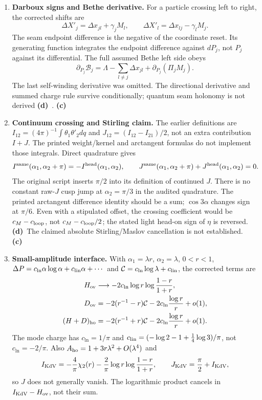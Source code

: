\documentclass[11pt,a4paper]{article}
\newcommand{\C}{\textbf{(c)}\ }
\newcommand{\D}{\textbf{(d)}\ }
\begin{document}
\begin{enumerate}[leftmargin=*]
$t\log t$ terms, so ``smooth'' is too strong.
\item \textbf{Darboux signs and Bethe derivative.} For a particle crossing
left to right, the corrected shifts are
\[
 \Delta X'_j=\Delta x_{jl}+\gamma_jM_l,\qquad
 \Delta X'_l=\Delta x_{lj}-\gamma_lM_j.
\]
The seam endpoint difference is the negative of the coordinate reset.
Its generating function integrates the endpoint difference against $dP_j$,
not $P_j$ against its differential. The full assumed Bethe left side obeys
\[
 \partial_{P_j}\mathcal B_j
 =\Lambda-\sum_{l\ne j}\Delta x_{jl}+\partial_{P_j}(\Pi_jM_j).
\]
The last self-winding derivative was omitted. The directional derivative
and summed charge rule survive conditionally; quantum seam holonomy is not
derived \D. \C
\item \textbf{Continuum crossing and Stirling claim.} The earlier definitions
are $I_{12}=(4\pi)^{-1}\int\theta_1\theta'_2dq$ and
$J_{12}=(I_{12}-I_{21})/2$, not an extra contribution $I+J$.
The printed weight/kernel and arctangent formulas do not implement those
integrals. Direct quadrature gives
\[
 I^{\rm same}(\alpha_1,\alpha_2+\pi)=-I^{\rm head}(\alpha_1,\alpha_2),
 \qquad J^{\rm same}(\alpha_1,\alpha_2+\pi)+J^{\rm head}(\alpha_1,\alpha_2)=0.
\]
The original script inserts $\pi/2$ into its definition of continued $J$.
There is no constant raw-$J$ cusp jump at $\alpha_2=\pi/3$ in the audited
quadrature. The printed arctangent difference identity should be a sum;
$\cos3\alpha$ changes sign at $\pi/6$. Even with a stipulated offset,
the crossing coefficient would be $c_M-c_{\rm loop}$, not
$c_M-c_{\rm loop}/2$; the stated light head-on sign of $\eta$ is reversed.
\D The claimed absolute Stirling/Maslov cancellation is not established. \C
\item \textbf{Small-amplitude interface.} With
$\alpha_1=\lambda r$, $\alpha_2=\lambda$, $0<r<1$,
$\Delta P=c_{\ln}\alpha\log\alpha+c_{\rm lin}\alpha+\cdots$ and
$\mathcal C=c_{\ln}\log\lambda+c_{\rm lin}$, the corrected terms are
\begin{align*}
 H_{\rm ov}&\longrightarrow-2c_{\ln}\log r\log\frac{1-r}{1+r},\\
 D_{\rm ov}&=-2(r^{-1}-r)\mathcal C-2c_{\ln}\frac{\log r}{r}+o(1),\\
 (H+D)_{\rm ho}&=-2(r^{-1}+r)\mathcal C-2c_{\ln}\frac{\log r}{r}+o(1).
\end{align*}
The mode charge has $c_{\ln}=1/\pi$ and
$c_{\rm lin}=(-\log2-1+\tfrac14\log3)/\pi$, not $c_{\ln}=-2/\pi$.
Also $A_{\rm ho}=1+3r\lambda^2+O(\lambda^4)$ and
\[
 I_{\rm KdV}=-\frac4\pi\chi_2(r)
 -\frac2\pi\log r\log\frac{1-r}{1+r},\qquad
 J_{\rm KdV}=\frac\pi2+I_{\rm KdV},
\]
so $J$ does not generally vanish. The logarithmic product cancels in
$I_{\rm KdV}-H_{\rm ov}$, not their sum.
\end{enumerate}
\end{document}
